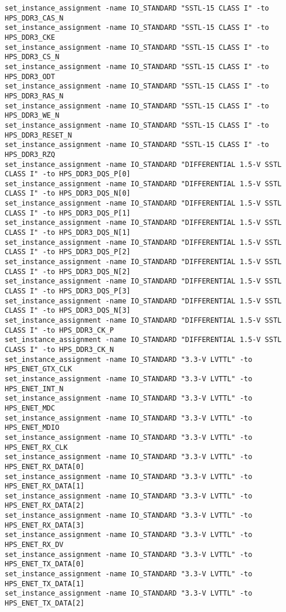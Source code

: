 \documentclass[dvipdfm]{book}
\begin{document}
\begin{verbatim}
set_instance_assignment -name IO_STANDARD "SSTL-15 CLASS I" -to HPS_DDR3_CAS_N
set_instance_assignment -name IO_STANDARD "SSTL-15 CLASS I" -to HPS_DDR3_CKE
set_instance_assignment -name IO_STANDARD "SSTL-15 CLASS I" -to HPS_DDR3_CS_N
set_instance_assignment -name IO_STANDARD "SSTL-15 CLASS I" -to HPS_DDR3_ODT
set_instance_assignment -name IO_STANDARD "SSTL-15 CLASS I" -to HPS_DDR3_RAS_N
set_instance_assignment -name IO_STANDARD "SSTL-15 CLASS I" -to HPS_DDR3_WE_N
set_instance_assignment -name IO_STANDARD "SSTL-15 CLASS I" -to HPS_DDR3_RESET_N
set_instance_assignment -name IO_STANDARD "SSTL-15 CLASS I" -to HPS_DDR3_RZQ
set_instance_assignment -name IO_STANDARD "DIFFERENTIAL 1.5-V SSTL CLASS I" -to HPS_DDR3_DQS_P[0]
set_instance_assignment -name IO_STANDARD "DIFFERENTIAL 1.5-V SSTL CLASS I" -to HPS_DDR3_DQS_N[0]
set_instance_assignment -name IO_STANDARD "DIFFERENTIAL 1.5-V SSTL CLASS I" -to HPS_DDR3_DQS_P[1]
set_instance_assignment -name IO_STANDARD "DIFFERENTIAL 1.5-V SSTL CLASS I" -to HPS_DDR3_DQS_N[1]
set_instance_assignment -name IO_STANDARD "DIFFERENTIAL 1.5-V SSTL CLASS I" -to HPS_DDR3_DQS_P[2]
set_instance_assignment -name IO_STANDARD "DIFFERENTIAL 1.5-V SSTL CLASS I" -to HPS_DDR3_DQS_N[2]
set_instance_assignment -name IO_STANDARD "DIFFERENTIAL 1.5-V SSTL CLASS I" -to HPS_DDR3_DQS_P[3]
set_instance_assignment -name IO_STANDARD "DIFFERENTIAL 1.5-V SSTL CLASS I" -to HPS_DDR3_DQS_N[3]
set_instance_assignment -name IO_STANDARD "DIFFERENTIAL 1.5-V SSTL CLASS I" -to HPS_DDR3_CK_P
set_instance_assignment -name IO_STANDARD "DIFFERENTIAL 1.5-V SSTL CLASS I" -to HPS_DDR3_CK_N
set_instance_assignment -name IO_STANDARD "3.3-V LVTTL" -to HPS_ENET_GTX_CLK
set_instance_assignment -name IO_STANDARD "3.3-V LVTTL" -to HPS_ENET_INT_N
set_instance_assignment -name IO_STANDARD "3.3-V LVTTL" -to HPS_ENET_MDC
set_instance_assignment -name IO_STANDARD "3.3-V LVTTL" -to HPS_ENET_MDIO
set_instance_assignment -name IO_STANDARD "3.3-V LVTTL" -to HPS_ENET_RX_CLK
set_instance_assignment -name IO_STANDARD "3.3-V LVTTL" -to HPS_ENET_RX_DATA[0]
set_instance_assignment -name IO_STANDARD "3.3-V LVTTL" -to HPS_ENET_RX_DATA[1]
set_instance_assignment -name IO_STANDARD "3.3-V LVTTL" -to HPS_ENET_RX_DATA[2]
set_instance_assignment -name IO_STANDARD "3.3-V LVTTL" -to HPS_ENET_RX_DATA[3]
set_instance_assignment -name IO_STANDARD "3.3-V LVTTL" -to HPS_ENET_RX_DV
set_instance_assignment -name IO_STANDARD "3.3-V LVTTL" -to HPS_ENET_TX_DATA[0]
set_instance_assignment -name IO_STANDARD "3.3-V LVTTL" -to HPS_ENET_TX_DATA[1]
set_instance_assignment -name IO_STANDARD "3.3-V LVTTL" -to HPS_ENET_TX_DATA[2]

\end{verbatim}
\end{document}

